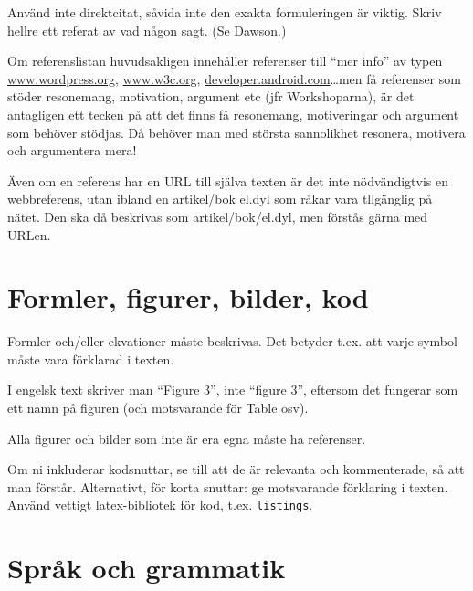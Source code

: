 \documentclass[swedish, a4paper,12pt]{article}
\begin{document}
Använd inte direktcitat, såvida inte den exakta formuleringen är viktig.  Skriv hellre ett referat av vad någon sagt. (Se Dawson.)

Om referenslistan huvudsakligen innehåller referenser till ``mer info'' av typen
\url{www.wordpress.org}, \url{www.w3c.org}, \url{developer.android.com}\ldots men få referenser som stöder resonemang, motivation, argument etc (jfr Workshoparna), är det antagligen ett tecken på att det finns få resonemang, motiveringar och argument som behöver stödjas. Då behöver man med största sannolikhet resonera, motivera och argumentera mera!

Även om en referens har en URL till själva texten är det inte nödvändigtvis en webbreferens, utan ibland en artikel/bok el.dyl som råkar vara tllgänglig på nätet. Den ska då beskrivas som artikel/bok/el.dyl, men förstås gärna med URLen.

\section{Formler, figurer, bilder, kod}
\label{sec:forml-figur-bild}

Formler och/eller ekvationer måste beskrivas.  Det betyder t.ex. att varje symbol måste vara förklarad i texten.

I engelsk text skriver man ``Figure 3'', inte ``figure 3'', eftersom det fungerar som ett namn på figuren (och motsvarande för Table osv).

Alla figurer och bilder som inte är era egna måste ha referenser.

Om ni inkluderar kodsnuttar, se till att de är relevanta och kommenterade, så att man förstår.  Alternativt, för korta snuttar: ge motsvarande förklaring i texten.
Använd vettigt latex-bibliotek för kod, t.ex. \texttt{listings}.

\section{Språk och grammatik}
\label{sec:sprak-och-grammatik}
\end{document}
